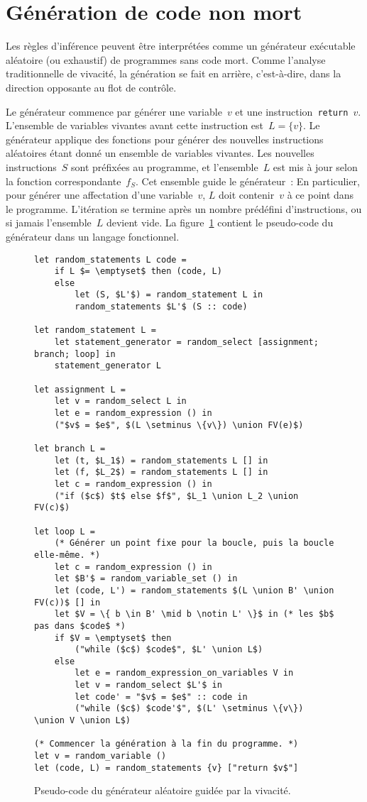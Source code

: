 \documentclass[a4paper]{easychair}
\def\union{\cup}
\begin{document}
\section{Génération de code non mort}

Les règles d'inférence peuvent être interprétées comme un générateur
exécutable aléatoire (ou exhaustif) de programmes sans code mort. Comme
l'analyse traditionnelle de vivacité, la génération se fait en arrière,
c'est-à-dire, dans la direction opposante au flot de contrôle.

Le générateur commence par générer une variable~\(v\) et une
instruction~\texttt{return \(v\)}. L'ensemble de variables vivantes avant
cette instruction est~\(L = \{v\}\). Le générateur applique des fonctions
pour générer des nouvelles instructions aléatoires étant donné un ensemble
de variables vivantes. Les nouvelles instructions~\(S\) sont préfixées au
programme, et l'ensemble~\(L\) est mis à jour selon la fonction
correspondante~\(f_S\). Cet ensemble guide le générateur~: En particulier,
pour générer une affectation d'une variable~\(v\), \(L\) doit contenir~\(v\)
à ce point dans le programme. L'itération se termine après un nombre
prédéfini d'instructions, ou si jamais l'ensemble~\(L\) devient vide. La
figure~\ref{fig:generator} contient le pseudo-code du générateur dans un
langage fonctionnel.

\begin{figure}
\begin{lstlisting}
let random_statements L code =
    if L $= \emptyset$ then (code, L)
    else
        let (S, $L'$) = random_statement L in
        random_statements $L'$ (S :: code)

let random_statement L =
    let statement_generator = random_select [assignment; branch; loop] in
    statement_generator L

let assignment L =
    let v = random_select L in
    let e = random_expression () in
    ("$v$ = $e$", $(L \setminus \{v\}) \union FV(e)$)

let branch L =
    let (t, $L_1$) = random_statements L [] in
    let (f, $L_2$) = random_statements L [] in
    let c = random_expression () in
    ("if ($c$) $t$ else $f$", $L_1 \union L_2 \union FV(c)$)

let loop L =
    (* Générer un point fixe pour la boucle, puis la boucle elle-même. *)
    let c = random_expression () in
    let $B'$ = random_variable_set () in
    let (code, L') = random_statements $(L \union B' \union FV(c))$ [] in
    let $V = \{ b \in B' \mid b \notin L' \}$ in (* les $b$ pas dans $code$ *)
    if $V = \emptyset$ then
        ("while ($c$) $code$", $L' \union L$)
    else
        let e = random_expression_on_variables V in
        let v = random_select $L'$ in
        let code' = "$v$ = $e$" :: code in
        ("while ($c$) $code'$", $(L' \setminus \{v\}) \union V \union L$)

(* Commencer la génération à la fin du programme. *)
let v = random_variable ()
let (code, L) = random_statements {v} ["return $v$"]
\end{lstlisting}
\caption{Pseudo-code du générateur aléatoire guidée par la vivacité.}
\label{fig:generator}
\end{figure}
\end{document}
